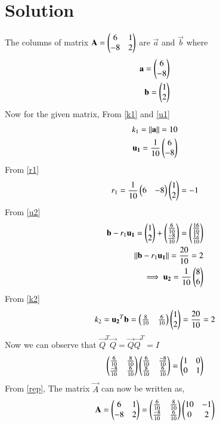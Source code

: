 \documentclass[journal,12pt,twocolumn]{IEEEtran}
\begin{document}
\section{Solution}
The columns of matrix $\mathbf{A}=\begin{pmatrix}6&1\\-8&2\end{pmatrix}$ are $\vec{a}$ and $\vec{b}$ where
\begin{align}
    \mathbf{a}=\begin{pmatrix}6\\-8\end{pmatrix}\label{a}\\
    \mathbf{b}=\begin{pmatrix}1\\2\end{pmatrix}\label{b}
\end{align}
Now for the given matrix, From \eqref{k1} and \eqref{u1}
\begin{align}
k_1=\left\lVert\mathbf{a}\right\rVert=10\\
\mathbf{u_1}=\frac{1}{10}\begin{pmatrix}6\\-8\end{pmatrix}
\end{align}
From \eqref{r1}
\begin{align}
r_1=\frac{1}{10}\begin{pmatrix}6&-8\end{pmatrix}\begin{pmatrix}1\\2\end{pmatrix}=-1
\end{align}
From \eqref{u2}
\begin{align}
\mathbf{b}-r_1\mathbf{u_1}=\begin{pmatrix}1\\2\end{pmatrix}+\begin{pmatrix}\frac{6}{10}\\\frac{-8}{10}\end{pmatrix}=\begin{pmatrix}\frac{16}{10}\\\frac{12}{10}\end{pmatrix}\\
\left\lVert\mathbf{b}-r_1\mathbf{u_1}\right\rVert=\frac{20}{10}=2\\
\implies \mathbf{u_2}=\frac{1}{10}\begin{pmatrix}8\\6\end{pmatrix}
\end{align}
From \eqref{k2}
\begin{align}
    k_2=\mathbf{u_2}^T\mathbf{b}=\begin{pmatrix}\frac{8}{10}&\frac{6}{10}\end{pmatrix}\begin{pmatrix}1\\2\end{pmatrix}=\frac{20}{10}=2
\end{align}
Now we can observe that $\vec{Q}^T\vec{Q}=\vec{Q}\vec{Q}^T=I$
\begin{align}
    \begin{pmatrix}\frac{6}{10}&\frac{8}{10}\\\frac{-8}{10}&\frac{6}{10}\end{pmatrix}
    \begin{pmatrix}\frac{6}{10}&\frac{-8}{10}\\\frac{8}{10}&\frac{6}{10}\end{pmatrix}=\begin{pmatrix}1&0\\0&1\end{pmatrix}
\end{align}
From \eqref{rep}, The matrix $\vec{A}$ can now be written as, 
\begin{align}
    \mathbf{A}=\begin{pmatrix}6&1\\-8&2\end{pmatrix}=\begin{pmatrix}\frac{6}{10}&\frac{8}{10}\\\frac{-8}{10}&\frac{6}{10}\end{pmatrix}
    \begin{pmatrix}10&-1\\0&2\end{pmatrix}
\end{align}
\end{document}
